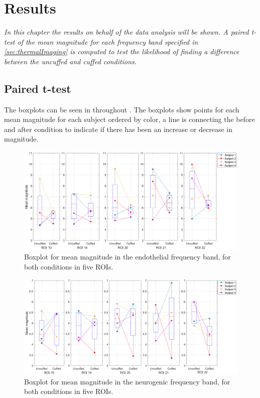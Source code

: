 \chapter{Results}
\textit{In this chapter the results on behalf of the data analysis will be shown. A paired t-test of the mean magnitude for each frequency band specified in \ref{sec:thermalImaging} is computed to test the likelihood of finding a difference between the uncuffed and cuffed conditions.}

\section{Paired t-test}
The boxplots can be seen in  throughout . The boxplots show points for each mean magnitude for each subject ordered by color, a line is connecting the before and after condition to indicate if there has been an increase or decrease in magnitude. 

\begin{figure}[H]
	\includegraphics[width=1\textwidth]{figures/boxplot_endo}
	\caption{Boxplot for mean magnitude in the endothelial frequency band, for both conditions in five ROIs.}
	\label{fig:boxEndo}
\end{figure}

\begin{figure}[H]
	\includegraphics[width=1\textwidth]{figures/boxplot_neuro}
	\caption{Boxplot for mean magnitude in the neurogenic frequency band, for both conditions in five ROIs.}
	\label{fig:boxNeuro}
\end{figure}

